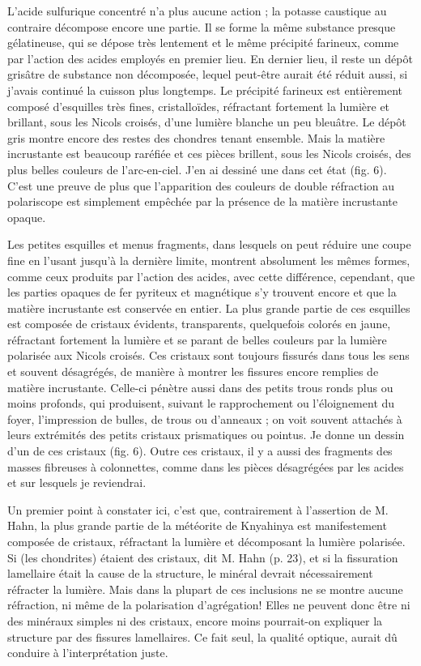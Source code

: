 \documentclass[a4paper, 12pt, oneside, french]{book}
\begin{document}
L'acide sulfurique concentré n'a plus aucune action ; la potasse caustique au contraire décompose encore une partie. Il se forme la même substance presque gélatineuse, qui se dépose très lentement et le même précipité farineux, comme par l'action des acides employés en premier lieu. En dernier lieu, il reste un dépôt grisâtre de substance non décomposée, lequel peut-être aurait été réduit aussi, si j'avais continué la cuisson plus longtemps. Le précipité farineux est entièrement composé d'esquilles très fines, cristalloïdes, réfractant fortement la lumière et brillant, sous les Nicols croisés, d'une lumière blanche un peu bleuâtre. Le dépôt gris montre encore des restes des chondres tenant ensemble. Mais la matière incrustante est beaucoup raréfiée et ces pièces brillent, sous les Nicols croisés, des plus belles couleurs de l'arc-en-ciel. J'en ai dessiné une dans cet état (fig. 6). C'est une preuve de plus que l'apparition des couleurs de double réfraction au polariscope est simplement empêchée par la présence de la matière incrustante opaque.

Les petites esquilles et menus fragments, dans lesquels on peut réduire une coupe fine en l'usant jusqu'à la dernière limite, montrent absolument les mêmes formes, comme ceux produits par l'action des acides, avec cette différence, cependant, que les parties opaques de fer pyriteux et magnétique s'y trouvent encore et que la matière incrustante est conservée en entier. La plus grande partie de ces esquilles est composée de cristaux évidents, transparents, quelquefois colorés en jaune, réfractant fortement la lumière et se parant de belles couleurs par la lumière polarisée aux Nicols croisés. Ces cristaux sont toujours fissurés dans tous les sens et souvent désagrégés, de manière à montrer les fissures encore remplies de matière incrustante. Celle-ci pénètre aussi dans des petits trous ronds plus ou moins profonds, qui produisent, suivant le rapprochement ou l'éloignement du foyer, l'impression de bulles, de trous ou d'anneaux ; on voit souvent attachés à leurs extrémités des petits cristaux prismatiques ou pointus. Je donne un dessin d'un de ces cristaux (fig. 6). Outre ces cristaux, il y a aussi des fragments des masses fibreuses à colonnettes, comme dans les pièces désagrégées par les acides et sur lesquels je reviendrai.

Un premier point à constater ici, c'est que, contrairement à l'assertion de M. Hahn, la plus grande partie de la météorite de Knyahinya est manifestement composée de cristaux, réfractant la lumière et décomposant la lumière polarisée. \og Si (les chondrites) étaient des cristaux, dit M. Hahn (p. 23), et si la fissuration lamellaire était la cause de la structure, le minéral devrait nécessairement réfracter la lumière. Mais dans la plupart de ces inclusions ne se montre aucune réfraction, ni même de la polarisation d'agrégation! Elles ne peuvent donc être ni des minéraux simples ni des cristaux, encore moins pourrait-on expliquer la structure par des fissures lamellaires. Ce fait seul, la qualité optique, aurait dû conduire à l'interprétation juste. \fg
\end{document}
